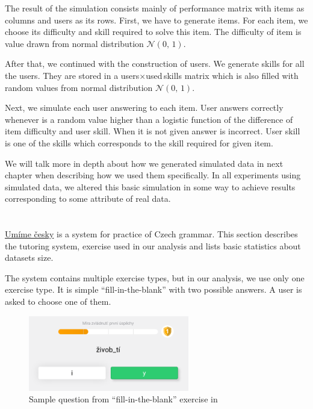 \documentclass[
  digital, %
  table,   %
  nolof,     %
  nolot,     %
  nocover,
  color
]{fithesis3}
\begin{document}
The result of the simulation consists mainly of performance matrix with items as columns and users as its rows. First, we have to generate items. For each item, we choose its difficulty and skill required to solve this item. The difficulty of item is value drawn from normal distribution $\mathcal{N}(0,\,1)$.

After that, we continued with the construction of users. We generate skills for all the users. They are stored in a users$\times$used\,skills matrix which is also filled with random values from normal distribution $\mathcal{N}(0,\,1)$.

Next, we simulate each user answering to each item. User answers correctly whenever is a random value higher than a logistic function of the difference of item difficulty and user skill. When it is not given answer is incorrect. User skill is one of the skills which corresponds to the skill required for given item.

We will talk more in depth about how we generated simulated data in next chapter when describing how we used them specifically. In all experiments using simulated data, we altered this basic simulation in some way to achieve results corresponding to some attribute of real data.


\section{\umimeCesky{}}\label{umime-cesky}


\href{https://umimecesky.cz/}{Umíme česky} is a system for practice of Czech grammar. This section describes the tutoring system, exercise used in our analysis and lists basic statistics about datasets size.

The system contains multiple exercise types, but in our analysis, we use only one exercise type. It is simple ``fill-in-the-blank'' with two possible answers. A user is asked to choose one of them.

\begin{figure}
  \includegraphics[width=7cm]{img/umimecesky_doplnovacka}
  \caption{Sample question from ``fill-in-the-blank'' exercise in \umimeCesky{}}
  \label{fig:umimeceskydoplnovacka}
\end{figure}
\end{document}
